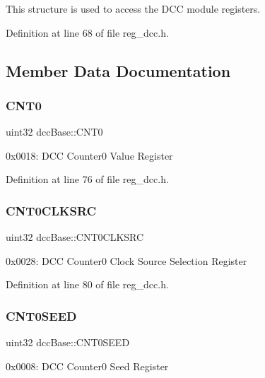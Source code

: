 This structure is used to access the D\+CC module registers. 

Definition at line 68 of file reg\+\_\+dcc.\+h.



\subsection{Member Data Documentation}
\mbox{\label{structdccBase_a795802596137979a0f841d2caef9cc1a}} 
\subsubsection{\texorpdfstring{C\+N\+T0}{CNT0}}
{\footnotesize\ttfamily uint32 dcc\+Base\+::\+C\+N\+T0}

0x0018\+: D\+CC Counter0 Value Register 

Definition at line 76 of file reg\+\_\+dcc.\+h.

\mbox{\label{structdccBase_a94f30186a23285fe3382fa80c9f71b97}} 
\subsubsection{\texorpdfstring{C\+N\+T0\+C\+L\+K\+S\+RC}{CNT0CLKSRC}}
{\footnotesize\ttfamily uint32 dcc\+Base\+::\+C\+N\+T0\+C\+L\+K\+S\+RC}

0x0028\+: D\+CC Counter0 Clock Source Selection Register 

Definition at line 80 of file reg\+\_\+dcc.\+h.

\mbox{\label{structdccBase_aba82f99ed2e90e633f0fd62cef5f1fda}} 
\subsubsection{\texorpdfstring{C\+N\+T0\+S\+E\+ED}{CNT0SEED}}
{\footnotesize\ttfamily uint32 dcc\+Base\+::\+C\+N\+T0\+S\+E\+ED}

0x0008\+: D\+CC Counter0 Seed Register 

